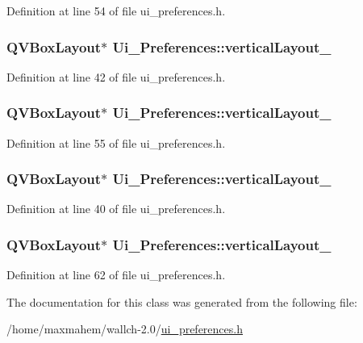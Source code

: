 Definition at line 54 of file ui\_\-preferences.h.

\hypertarget{classUi__Preferences_a8d2ebaea31177b90094be7df939bd59b}{
\subsubsection[{verticalLayout\_\-3}]{\setlength{\rightskip}{0pt plus 5cm}QVBoxLayout$\ast$ {\bf Ui\_\-Preferences::verticalLayout\_}}}
\label{classUi__Preferences_a8d2ebaea31177b90094be7df939bd59b}


Definition at line 42 of file ui\_\-preferences.h.

\hypertarget{classUi__Preferences_aad94bab0c1ff59e70d9504a6a1059b57}{
\subsubsection[{verticalLayout\_\-4}]{\setlength{\rightskip}{0pt plus 5cm}QVBoxLayout$\ast$ {\bf Ui\_\-Preferences::verticalLayout\_}}}
\label{classUi__Preferences_aad94bab0c1ff59e70d9504a6a1059b57}


Definition at line 55 of file ui\_\-preferences.h.

\hypertarget{classUi__Preferences_ae3127ba315cedc5477a5de16a64ac2a3}{
\subsubsection[{verticalLayout\_\-5}]{\setlength{\rightskip}{0pt plus 5cm}QVBoxLayout$\ast$ {\bf Ui\_\-Preferences::verticalLayout\_}}}
\label{classUi__Preferences_ae3127ba315cedc5477a5de16a64ac2a3}


Definition at line 40 of file ui\_\-preferences.h.

\hypertarget{classUi__Preferences_aa975484d171a6009bd13454e1daa5d1b}{
\subsubsection[{verticalLayout\_\-6}]{\setlength{\rightskip}{0pt plus 5cm}QVBoxLayout$\ast$ {\bf Ui\_\-Preferences::verticalLayout\_}}}
\label{classUi__Preferences_aa975484d171a6009bd13454e1daa5d1b}


Definition at line 62 of file ui\_\-preferences.h.



The documentation for this class was generated from the following file:\begin{DoxyCompactItemize}
\item 
/home/maxmahem/wallch-\/2.0/\hyperlink{ui__preferences_8h}{ui\_\-preferences.h}\end{DoxyCompactItemize}
